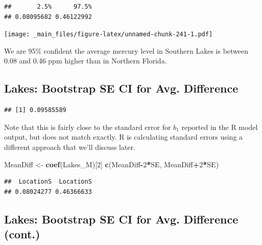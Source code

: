 \documentclass[]{book}
\newenvironment{Shaded}{\begin{snugshade}}{\end{snugshade}}
\newcommand{\KeywordTok}[1]{\textcolor[rgb]{0.13,0.29,0.53}{\textbf{#1}}}
\newcommand{\DecValTok}[1]{\textcolor[rgb]{0.00,0.00,0.81}{#1}}
\newcommand{\StringTok}[1]{\textcolor[rgb]{0.31,0.60,0.02}{#1}}
\newcommand{\OperatorTok}[1]{\textcolor[rgb]{0.81,0.36,0.00}{\textbf{#1}}}
\newcommand{\NormalTok}[1]{#1}
\begin{document}
\begin{verbatim}
##       2.5%      97.5% 
## 0.08095682 0.46122992
\end{verbatim}

\texttt{[image: \_main\_files/figure-latex/unnamed-chunk-241-1.pdf]}

We are 95\% confident the average mercury level in Southern Lakes is
between 0.08 and 0.46 ppm higher than in Northern Florida.

\subsection{Lakes: Bootstrap SE CI for Avg.
Difference}\label{lakes-bootstrap-se-ci-for-avg.-difference}

\begin{Shaded}
\end{Shaded}

\begin{verbatim}
## [1] 0.09585589
\end{verbatim}

Note that this is fairly close to the standard error for \(b_1\)
reported in the R model output, but does not match exactly. R is
calculating standard errors using a different approach that we'll
discuss later.

\begin{Shaded}
\begin{Highlighting}[]
\NormalTok{MeanDiff <-}\StringTok{ }\KeywordTok{coef}\NormalTok{(Lakes_M)[}\DecValTok{2}\NormalTok{]}
\KeywordTok{c}\NormalTok{(MeanDiff}\OperatorTok{-}\DecValTok{2}\OperatorTok{*}\NormalTok{SE, MeanDiff}\OperatorTok{+}\DecValTok{2}\OperatorTok{*}\NormalTok{SE)}
\end{Highlighting}
\end{Shaded}

\begin{verbatim}
##  LocationS  LocationS 
## 0.08024277 0.46366633
\end{verbatim}

\subsection{Lakes: Bootstrap SE CI for Avg. Difference
(cont.)}\label{lakes-bootstrap-se-ci-for-avg.-difference-cont.}
\end{document}
